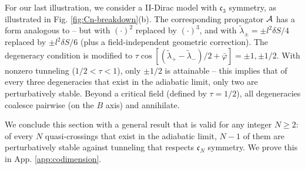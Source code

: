 \documentclass[aps, prb, showpacs, twocolumn, notitlepage, superscriptaddress]{revtex4-1}
\begin{document}









For our last illustration, we consider a II-Dirac model with $\mathfrak{c}_3$  symmetry, as   illustrated in Fig. \ref{fig:Cn-breakdown}(b). The corresponding propagator ${\cal A}$ has a form analogous to  -- but with $(\cdot)^2$ replaced by $(\cdot)^3$, and with $\tilde{\lambda}_\pm{=}{\pm} l^2\delta S/4$ replaced by $\pm l^2\delta S/6$ (plus a field-independent geometric correction). The degeneracy condition is modified to $\tau\cos[(\tilde{\lambda}_+-\tilde{\lambda}_-)/2{+}\bar{\varphi}]{=}{\pm} 1,{\pm} 1/2$. With nonzero tunneling ($1/2{<}\tau {<}1$), only $\pm 1/2$ is attainable -- this implies that of every three degeneracies that exist in the adiabatic limit, only two are perturbatively stable. Beyond a critical field  (defined by $\tau{=}1/2$), all degeneracies coalesce pairwise (on the $B$ axis) and annihilate. 

We conclude this section with a general result that is valid for any integer $N{\geq}2$: of every $N$ quasi-crossings that exist in the adiabatic limit, $N{-}1$ of them are perturbatively stable against tunneling that respects  $\mathfrak{c}_N$ symmetry. We prove this in App. \ref{app:codimension}.


\end{document}
